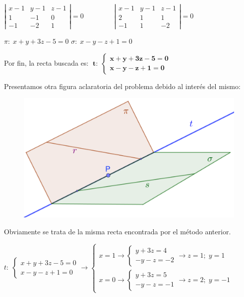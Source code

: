 \normalsize{$\left| \begin{matrix} x-1&y-1&z-1 \\ 1&-1&0 \\ -1&-2&1  \end{matrix} \right|=0 \qquad $} \hspace{3mm} $\qquad \left| \begin{matrix} x-1&y-1&z-1 \\ 2&1&1 \\ -1&1&-2  \end{matrix} \right|=0$

$\pi: \; x+y+3z-5=0$ \hspace{22mm} $\sigma:\;x-y-z+1=0$

Por fin, la recta buscada es: $\; \boldsymbol{t:\; \begin{cases}  x+y+3z-5=0 \\ x-y-z+1=0\end{cases}}$

Presentamos otra figura aclaratoria del problema debido al interés del mismo:

\begin{figure}[H]
	\centering
	\includegraphics[width=.8\textwidth]{imagenes/imagenes10/T10IM21.png}
\end{figure}

\noindent \textcolor{gris}{Obviamente se trata de la misma recta encontrada por el método anterior.}

\noindent \textcolor{gris}{$t:\; \begin{cases}  x+y+3z-5=0 \\ x-y-z+1=0\end{cases} \to \begin{cases}
x=1 \to  \begin{cases} y+3z=4\\-y-z=-2  \end{cases} \to z=1;\; y=1
\\
x=0 \to  \begin{cases} y+3z=5\\-y-z=-1  \end{cases} \to z=2; \; y=-1
\end{cases}$ }

